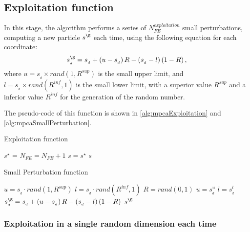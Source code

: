 \subsection{Exploitation function}
\label{sec:exploitation}

In this stage, the algorithm performs a series of $N_{FE}^{exploitation}$ small perturbations, computing a new particle $s^\S$ each time, using the following equation for each coordinate:
%
\begin{equation}
s_{_d}^\S = s_{_d} + \left(u - s_{_d}\right) R- \left(s_{_d} - l\right)\left(1 - R\right),
\end{equation}
%
where $u = s_{_d} \times rand(1,R^{sup})$ is the small upper limit, and $l = s_{_d} \times rand(R^{inf},1)$ is the small lower limit, with a superior value $R^{sup}$ and a inferior value $R^{inf}$ for the generation of the random number.

The pseudo-code of this function is shown in \autoref{alg:mpcaExploitation} and \autoref{alg:mpcaSmallPerturbation}.

\begin{algorithm}[H]
\caption{Exploitation function}
\label{alg:mpcaExploitation}
\footnotesize
\begin{algorithmic}[1]
\State $s^\star$ = 
\State $N_{FE} = N_{FE} + 1$
\State $s = s^\star$
\EndIf
\EndFor
\State \Return $s$
\EndFunction
\end{algorithmic}
\end{algorithm}

\begin{algorithm}[H]
\caption{Small Perturbation function}
\label{alg:mpcaSmallPerturbation}
\footnotesize
\begin{algorithmic}[1]
\State $u = s_{_d} \cdot rand(1,R^{sup})$
\State $l = s_{_d} \cdot rand(R^{inf},1)$
\State $R = rand(0,1)$
\State $u = s^u_{_d}$
\EndIf
{}
\State $l = s^l_{_d}$
\EndIf
\State $s_{_d}^\S = s_{_d} + \left(u - s_{_d}\right) R- \left(s_{_d} - l\right)\left(1 - R\right)$
\EndFor
\State \Return $s^\S$
\EndFunction
\end{algorithmic}
\end{algorithm}

\subsubsection{Exploitation in a single random dimension each time}

